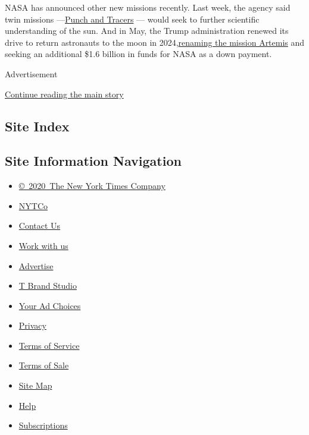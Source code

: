 NASA has announced other new missions recently. Last week, the agency
said twin missions
---\href{https://www.nasa.gov/press-release/nasa-selects-missions-to-study-our-sun-its-effects-on-space-weather}{Punch
and Tracers} --- would seek to further scientific understanding of the
sun. And in May, the Trump administration renewed its drive to return
astronauts to the moon in
2024,\href{https://www.nytimes3xbfgragh.onion/2019/05/22/science/trump-moon-nasa.html}{renaming
the mission Artemis} and seeking an additional \$1.6 billion in funds
for NASA as a down payment.

Advertisement

\protect\hyperlink{after-bottom}{Continue reading the main story}

\hypertarget{site-index}{%
\subsection{Site Index}\label{site-index}}

\hypertarget{site-information-navigation}{%
\subsection{Site Information
Navigation}\label{site-information-navigation}}

\begin{itemize}
\tightlist
\item
  \href{https://help.nytimes3xbfgragh.onion/hc/en-us/articles/115014792127-Copyright-notice}{©~2020~The
  New York Times Company}
\end{itemize}

\begin{itemize}
\tightlist
\item
  \href{https://www.nytco.com/}{NYTCo}
\item
  \href{https://help.nytimes3xbfgragh.onion/hc/en-us/articles/115015385887-Contact-Us}{Contact
  Us}
\item
  \href{https://www.nytco.com/careers/}{Work with us}
\item
  \href{https://nytmediakit.com/}{Advertise}
\item
  \href{http://www.tbrandstudio.com/}{T Brand Studio}
\item
  \href{https://www.nytimes3xbfgragh.onion/privacy/cookie-policy\#how-do-i-manage-trackers}{Your
  Ad Choices}
\item
  \href{https://www.nytimes3xbfgragh.onion/privacy}{Privacy}
\item
  \href{https://help.nytimes3xbfgragh.onion/hc/en-us/articles/115014893428-Terms-of-service}{Terms
  of Service}
\item
  \href{https://help.nytimes3xbfgragh.onion/hc/en-us/articles/115014893968-Terms-of-sale}{Terms
  of Sale}
\item
  \href{https://spiderbites.nytimes3xbfgragh.onion}{Site Map}
\item
  \href{https://help.nytimes3xbfgragh.onion/hc/en-us}{Help}
\item
  \href{https://www.nytimes3xbfgragh.onion/subscription?campaignId=37WXW}{Subscriptions}
\end{itemize}

